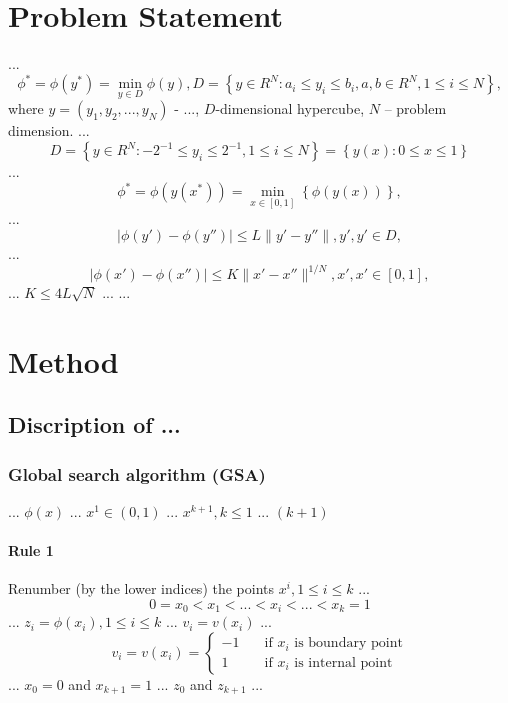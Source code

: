\documentclass[runningheads]{llncs}
\begin{document}
\section{Problem Statement}
...
\begin{equation}
\phi^*=\phi(y^* )=\min_{y \in D} \phi(y), D=\left\{ y \in R^N: a_i \leq y_i \leq b_i, a,b \in R^N,1 \leq i \leq N \right\},
\end{equation}
where $y=(y_1,y_2,...,y_N)$ - ..., $D$-dimensional hypercube, $N$ – problem dimension.
... 
$$
D=\left\{ y \in R^N: -2^{-1} \leq y_i \leq 2^{-1}, 1 \leq i \leq N \right\} = \left\{ y(x): 0 \leq x \leq 1 \right\}
$$
...
\begin{equation}
\phi^*=\phi(y(x^* ))=\min_{x \in [0,1]} \left\{ \phi(y(x)) \right\},
\end{equation}
...
\begin{equation}
| \phi (y')-\phi (y'') | \leq L \| y'-y'' \|, y',y' \in D,
\end{equation}
...
\begin{equation}
| \phi (x')-\phi (x'') | \leq K \| x'-x'' \| ^{1/N}, x',x' \in [0,1],
\end{equation}
... $K \leq 4L\sqrt N$ ...
...

\section{Method}

\subsection{Discription of ... }

\subsubsection{Global search algorithm (GSA)} ... $\phi (x)$ ... $x^1 \in (0,1)$ ... $x^{k+1}, k \leq 1$ ... $(k+1)$

\paragraph{Rule 1} Renumber (by the lower indices) the points $x^i, 1 \leq i \leq k$  ...
\begin{equation}
0=x_0 < x_1 < ... < x_i < ... < x_k=1
\end{equation}
... $z_i=\phi (x_i), 1 \leq i \leq k$ ... $v_i=v(x_i)$ ...
\begin{equation}
v_i=v(x_i)=
  \begin{cases}
    -1 & {\quad \text{if } x_i \text{ is boundary point}}\\
    1  & {\quad \text{if } x_i \text{ is internal point}}
  \end{cases}
\end{equation}
... $x_0=0$ and $x_{k+1}=1$ ... $z_0$ and $z_{k+1}$ ...
\end{document}
